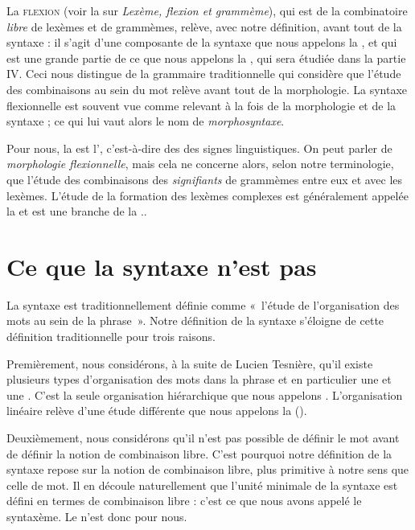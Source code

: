 La \textsc{flexion} (voir la  sur \textit{{Lexème, flexion et grammème}}), qui est de la combinatoire \textit{libre} de lexèmes et de grammèmes, relève, avec notre définition, avant tout de la syntaxe : il s’agit d’une composante de la syntaxe que nous appelons la , et qui est une grande partie de ce que nous appelons la , qui sera étudiée dans la partie IV. Ceci nous distingue de la grammaire traditionnelle qui considère que l’étude des combinaisons au sein du mot relève avant tout de la morphologie. La syntaxe flexionnelle est souvent vue comme relevant à la fois de la morphologie et de la syntaxe ; ce qui lui vaut alors le nom de \textit{morphosyntaxe}.

Pour nous, la  est l’, c’est-à-dire des  des signes linguistiques. On peut parler de \textit{morphologie flexionnelle}, mais cela ne concerne alors, selon notre terminologie, que l’étude des combinaisons des \textit{signifiants} de grammèmes entre eux et avec les lexèmes. L’étude de la formation des lexèmes complexes est généralement appelée la  et est une branche de la ..

\section{Ce que la syntaxe n’est pas}\label{sec:3.1.7}

La syntaxe est traditionnellement définie comme «~l’étude de l’organisation des mots au sein de la phrase~». Notre définition de la syntaxe s’éloigne de cette définition traditionnelle pour trois raisons.

Premièrement, nous considérons, à la suite de Lucien Tesnière, qu’il existe plusieurs types d’organisation des mots dans la phrase et en particulier une  et une . C’est la seule organisation hiérarchique que nous appelons . L’organisation linéaire relève d’une étude différente que nous appelons la  ().

Deuxièmement, nous considérons qu’il n’est pas possible de définir le mot avant de définir la notion de combinaison libre. C’est pourquoi notre définition de la syntaxe repose sur la notion de combinaison libre, plus primitive à notre sens que celle de mot. Il en découle naturellement que l’unité minimale de la syntaxe est défini en termes de combinaison libre : c’est ce que nous avons appelé le syntaxème. Le  n’est donc   pour nous.

